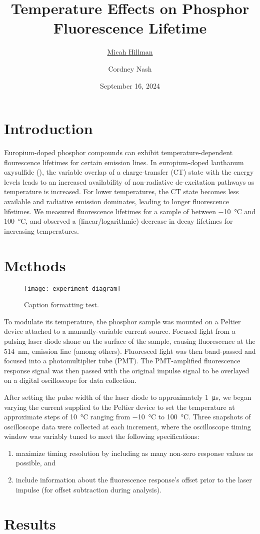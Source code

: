 \documentclass[12pt]{article}
\title{Temperature Effects on Phosphor Fluorescence Lifetime}
\date{September 16, 2024}
\author{\ul{Micah Hillman} \and Cordney Nash}
\begin{document}
  \maketitle

  \section*{Introduction}{
    Europium-doped phosphor compounds can exhibit temperature-dependent flourescence lifetimes for certain emission lines. In europium-doped lanthanum oxysulfide (), the variable overlap of a charge-transfer (CT) state with the  energy levels leads to an increased availability of non-radiative de-excitation pathways as temperature is increased. For lower temperatures, the CT state becomes less available and radiative emission dominates, leading to longer fluorescence lifetimes. We measured fluorescence lifetimes for a sample of  between \SI{-10}{\degreeCelsius} and \SI{100}{\degreeCelsius}, and observed a (linear/logarithmic) decrease in decay lifetimes for increasing temperatures.
  }

  \section*{Methods}{

  \begin{figure}[h]
    \centering
    \texttt{[image: experiment\_diagram]}
    \caption{Caption formatting test.}
    \label{fig:setup}
  \end{figure}

    To modulate its temperature, the phosphor sample was mounted on a Peltier device attached to a manually-variable current source. Focused light from a pulsing laser diode shone on the surface of the sample, causing fluorescence at the \SI{514}{\nm},  emission line (among others). Fluoresced light was then band-passed and focused into a photomultiplier tube (PMT). The PMT-amplified fluorescence response signal was then passed with the original impulse signal to be overlayed on a digital oscilloscope for data collection.
    
    After setting the pulse width of the laser diode to approximately \SI{1}{\micro\second}, we began varying the current supplied to the Peltier device to set the temperature at approximate steps of \SI{10}{\degreeCelsius} ranging from \SI{-10}{\degreeCelsius} to \SI{100}{\degreeCelsius}. Three snapshots of oscilloscope data were collected at each increment, where the oscilloscope timing window was variably tuned to meet the following specifications:
      
      \begin{enumerate}
        \item maximize timing resolution by including as many non-zero response values as possible, and
        \item include information about the fluorescence response's offset prior to the laser impulse (for offset subtraction during analysis).
      \end{enumerate}
    
    
    
  }

  \section*{Results}{
    \lipsum[1]
  }
\end{document}

